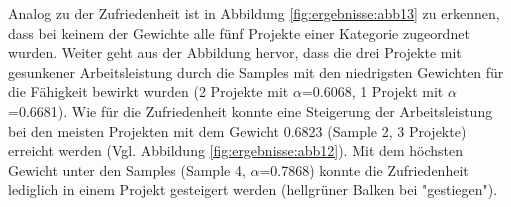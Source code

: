 Analog zu der Zufriedenheit ist in Abbildung \ref{fig:ergebnisse:abb13} zu erkennen, dass bei keinem der Gewichte alle fünf Projekte einer Kategorie zugeordnet wurden.
Weiter geht aus der Abbildung hervor, dass die drei Projekte mit gesunkener Arbeitsleistung durch die Samples mit den niedrigsten Gewichten für die Fähigkeit bewirkt wurden (2 Projekte mit $\alpha$=0.6068, 1 Projekt mit $\alpha$=0.6681).
Wie für die Zufriedenheit konnte eine Steigerung der Arbeitsleistung bei den meisten Projekten mit dem Gewicht 0.6823 (Sample 2, 3 Projekte) erreicht werden (Vgl. Abbildung \ref{fig:ergebnisse:abb12}).
Mit dem höchsten Gewicht unter den Samples (Sample 4, $\alpha$=0.7868) konnte die Zufriedenheit lediglich in einem Projekt gesteigert werden (hellgrüner Balken bei "gestiegen").



